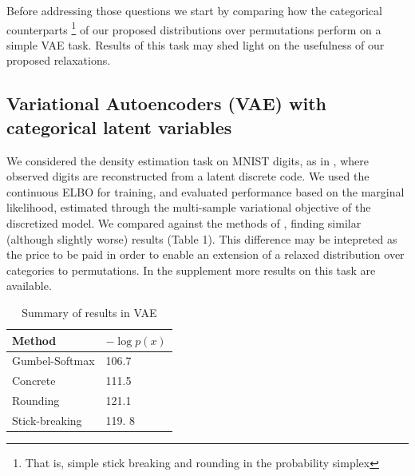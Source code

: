 \documentclass[twoside]{article}
\begin{document}
Before addressing those questions we start by comparing how the categorical counterparts \footnote{That is, simple stick breaking and rounding in the probability simplex} of our proposed distributions over permutations perform on a simple VAE task.  Results of this task may shed light on the usefulness of our proposed relaxations.

\subsection{Variational Autoencoders (VAE) with categorical latent variables}
We considered the density estimation
task on MNIST digits, as in \cite{maddison2016concrete,
  jang2016categorical}, where observed digits are reconstructed from a
latent discrete code. We used the continuous ELBO for training, and
evaluated performance based on the marginal likelihood, estimated
through the multi-sample variational objective of the discretized
model. We compared against the methods of
\cite{jang2016categorical, maddison2016concrete}, finding similar (although slightly worse) results (Table 1). This difference may be intepreted as the price to be paid in order to enable an extension of a relaxed distribution over categories to permutations.  In the supplement more results on this task are available.
\begin{table}[t]
  \caption{Summary of results in VAE}
  \label{tab:vae}
  \centering
  \begin{tabular}{ll}
    \textbf{Method} & $- \log p(x)$ \\
    \hline
    Gumbel-Softmax    & 106.7 \\
    Concrete  &  111.5\\
    Rounding &  121.1 \\
    Stick-breaking & 119. 8\\
    \bottomrule
  \end{tabular}
\end{table}


   
\end{document}
